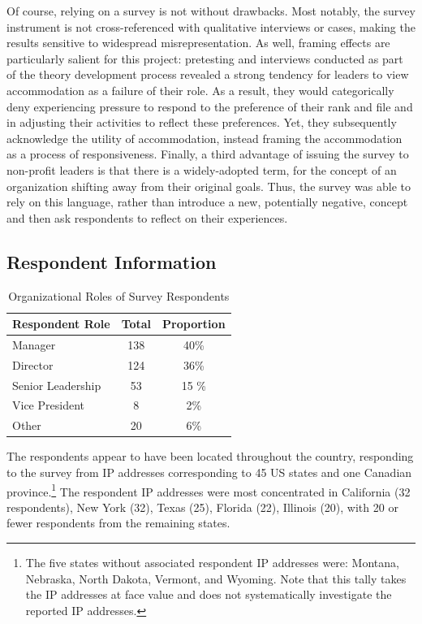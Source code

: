 Of course, relying on a survey is not without drawbacks. Most notably, the survey instrument is not cross-referenced with qualitative interviews or cases, making the results sensitive to widespread misrepresentation.  As well, framing effects are particularly salient for this project: pretesting and interviews conducted as part of the theory development process revealed a strong tendency for leaders to view accommodation as a failure of their role. As a result, they would categorically deny experiencing pressure to respond to the preference of their rank and file and in adjusting their activities to reflect these preferences. Yet, they subsequently acknowledge the utility of accommodation, instead framing the accommodation as a process of responsiveness. Finally, a third advantage of issuing the survey to non-profit leaders is that there is a widely-adopted term,  for the concept of an organization shifting away from their original goals.  Thus, the survey was able to rely on this language, rather than introduce a  new, potentially negative, concept and then ask respondents to reflect on their experiences. 

\subsection{Respondent Information}
\begin{table}
\centering
\begin{tabular}{lcc}
Respondent Role  & Total & Proportion\\
\hline
\hline
Manager & 138 & 40\%\\
\hline
Director & 124 & 36\% \\
\hline
Senior Leadership & 53 & 15 \% \\
\hline
Vice President & 8 & 2\% \\
\hline
Other & 20 & 6\% \\
\end{tabular}
\caption{Organizational Roles of Survey Respondents}
\label{tab:survey1}
\end{table}

The respondents appear to have been located throughout the country, responding to the survey from IP addresses corresponding to 45 US states and one Canadian province.\footnote{The five states without associated respondent IP addresses were: Montana, Nebraska, North Dakota, Vermont, and Wyoming. Note that this tally takes the IP addresses at face value and does not systematically investigate the reported IP addresses.} The respondent IP addresses were most concentrated in California (32 respondents), New York (32), Texas (25), Florida (22), Illinois (20), with 20 or fewer respondents from the remaining states. 

